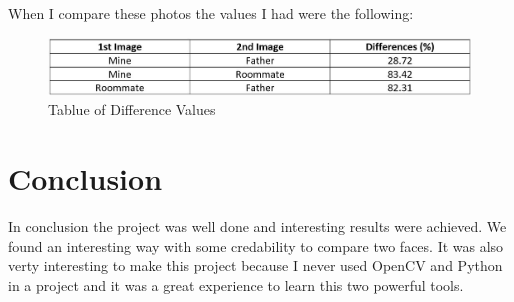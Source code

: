 \documentclass[12pt]{article}
\begin{document}
When I compare these photos the values I had were the following:

\begin{figure}[!h]
	\center\includegraphics[width=1\textwidth]{img/Table.jpg}
	\caption{Tablue of Difference Values}
\end{figure}

\section{Conclusion}

In conclusion the project was well done and interesting results were achieved. We found an interesting way with some credability to compare two faces. It was also verty interesting to make this project because I never used OpenCV and Python in a project and it was a great experience to learn this two powerful tools.
\end{document}
